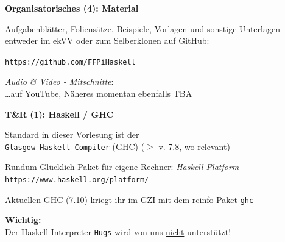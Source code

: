 \documentclass[unknownkeysallowed]{beamer}
\begin{document}
  
  \begin{frame}
	\Large\textbf{Organisatorisches (4): Material}\bigskip \normalsize
	
	Aufgabenblätter, Foliensätze, Beispiele, Vorlagen und sonstige Unterlagen entweder im ekVV oder zum Selberklonen auf GitHub:
	
	\bigskip\texttt{https://github.com/FFPiHaskell}\bigskip
	
	\emph{Audio \& Video - Mitschnitte}:\\ \dots auf YouTube, Näheres momentan ebenfalls TBA
  \end{frame}
  
  
  \begin{frame}
    \Large\textbf{T\&R (1): Haskell / GHC}\bigskip \normalsize
    
    Standard in dieser Vorlesung ist der  \\ \texttt{Glasgow Haskell Compiler} (GHC)
    ($\geqslant$ v. 7.8, wo relevant) \pause \bigskip
    
    Rundum-Glücklich-Paket für eigene Rechner: \emph{Haskell Platform}\\
    \texttt{https://www.haskell.org/platform/} \pause \bigskip
    
    Aktuellen GHC (7.10) kriegt ihr im GZI mit dem rcinfo-Paket \texttt{ghc} \pause \smallskip
    
    \begin{important}
    \textbf{Wichtig:}\\Der Haskell-Interpreter \texttt{Hugs} wird von uns \underline{nicht} unterstützt!
    \end{important}
  \end{frame}
  
  
\end{document}
